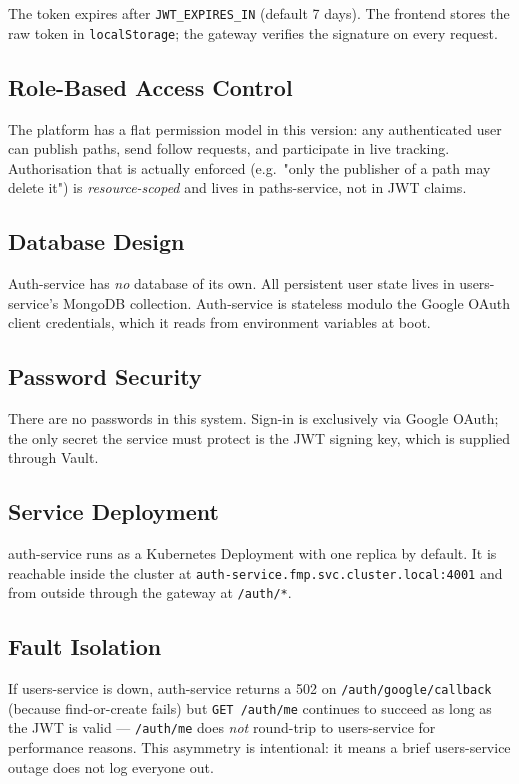 \documentclass[11pt,a4paper]{article}
\begin{document}
The token expires after \texttt{JWT\_EXPIRES\_IN} (default 7 days).
The frontend stores the raw token in \texttt{localStorage}; the
gateway verifies the signature on every request.

\subsection{Role-Based Access Control}
The platform has a flat permission model in this version: any
authenticated user can publish paths, send follow requests, and
participate in live tracking.  Authorisation that is actually enforced
(e.g.\ "only the publisher of a path may delete it") is
\emph{resource-scoped} and lives in paths-service, not in JWT claims.

\subsection{Database Design}
Auth-service has \emph{no} database of its own.  All persistent user
state lives in users-service's MongoDB collection.  Auth-service is
stateless modulo the Google OAuth client credentials, which it reads
from environment variables at boot.

\subsection{Password Security}
There are no passwords in this system.  Sign-in is exclusively via
Google OAuth; the only secret the service must protect is the JWT
signing key, which is supplied through Vault.

\subsection{Service Deployment}
auth-service runs as a Kubernetes Deployment with one replica by
default.  It is reachable inside the cluster at
\texttt{auth-service.fmp.svc.cluster.local:4001} and from outside
through the gateway at \texttt{/auth/*}.

\subsection{Fault Isolation}
If users-service is down, auth-service returns a 502 on
\texttt{/auth/google/callback} (because find-or-create fails) but
\texttt{GET /auth/me} continues to succeed as long as the JWT is
valid — \texttt{/auth/me} does \emph{not} round-trip to users-service
for performance reasons.  This asymmetry is intentional: it means a
brief users-service outage does not log everyone out.
\end{document}

